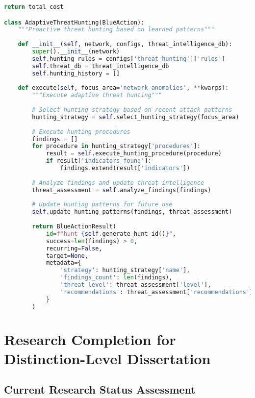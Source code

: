 \documentclass[12pt,a4paper]{article}
\begin{document}
\begin{lstlisting}[language=Python, caption=Advanced Blue Agent Actions]
        return total_cost

class AdaptiveThreatHunting(BlueAction):
    """Proactive threat hunting based on learned patterns"""
    
    def __init__(self, network, configs, threat_intelligence_db):
        super().__init__(network)
        self.hunting_rules = configs['threat_hunting']['rules']
        self.threat_db = threat_intelligence_db
        self.hunting_history = []
    
    def execute(self, focus_area='network_anomalies', **kwargs):
        """Execute adaptive threat hunting"""
        
        # Select hunting strategy based on recent attack patterns
        hunting_strategy = self.select_hunting_strategy(focus_area)
        
        # Execute hunting procedures
        findings = []
        for procedure in hunting_strategy['procedures']:
            result = self.execute_hunting_procedure(procedure)
            if result['indicators_found']:
                findings.extend(result['indicators'])
        
        # Analyze findings and update threat intelligence
        threat_assessment = self.analyze_findings(findings)
        
        # Update hunting patterns for future use
        self.update_hunting_patterns(findings, threat_assessment)
        
        return BlueActionResult(
            id=f"hunt_{self.generate_hunt_id()}",
            success=len(findings) > 0,
            recurring=False,
            target=None,
            metadata={
                'strategy': hunting_strategy['name'],
                'findings_count': len(findings),
                'threat_level': threat_assessment['level'],
                'recommendations': threat_assessment['recommendations']
            }
        )
\end{lstlisting}

\section{Research Completion for Distinction-Level Dissertation}

\subsection{Current Research Status Assessment}
\end{document}

